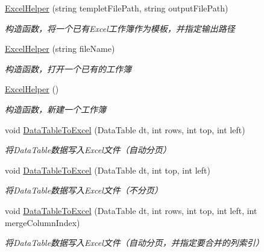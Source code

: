 \begin{DoxyCompactItemize}
\item 
\hyperlink{class_x_c_l_net_tools_1_1_office_1_1_excel_handler_1_1_excel_helper_a12c422938f2054941e10baa671676383}{Excel\-Helper} (string templet\-File\-Path, string output\-File\-Path)
\begin{DoxyCompactList}\small\item\em 构造函数，将一个已有\-Excel工作簿作为模板，并指定输出路径 \end{DoxyCompactList}\item 
\hyperlink{class_x_c_l_net_tools_1_1_office_1_1_excel_handler_1_1_excel_helper_a92dad5cbd48287b013aa81ca90d02fb6}{Excel\-Helper} (string file\-Name)
\begin{DoxyCompactList}\small\item\em 构造函数，打开一个已有的工作簿 \end{DoxyCompactList}\item 
\hyperlink{class_x_c_l_net_tools_1_1_office_1_1_excel_handler_1_1_excel_helper_ab7738aab96d5a2ebc7d5c8a72899edf1}{Excel\-Helper} ()
\begin{DoxyCompactList}\small\item\em 构造函数，新建一个工作簿 \end{DoxyCompactList}\item 
void \hyperlink{class_x_c_l_net_tools_1_1_office_1_1_excel_handler_1_1_excel_helper_aff2b9ad2316d2acf6908da2929b5a103}{Data\-Table\-To\-Excel} (Data\-Table dt, int rows, int top, int left)
\begin{DoxyCompactList}\small\item\em 将\-Data\-Table数据写入\-Excel文件（自动分页） \end{DoxyCompactList}\item 
void \hyperlink{class_x_c_l_net_tools_1_1_office_1_1_excel_handler_1_1_excel_helper_ad8dc84e458463633d1027acdfadc5d2c}{Data\-Table\-To\-Excel} (Data\-Table dt, int top, int left)
\begin{DoxyCompactList}\small\item\em 将\-Data\-Table数据写入\-Excel文件（不分页） \end{DoxyCompactList}\item 
void \hyperlink{class_x_c_l_net_tools_1_1_office_1_1_excel_handler_1_1_excel_helper_a0d9c977adcc92c1e57560f1d713f74be}{Data\-Table\-To\-Excel} (Data\-Table dt, int rows, int top, int left, int merge\-Column\-Index)
\begin{DoxyCompactList}\small\item\em 将\-Data\-Table数据写入\-Excel文件（自动分页，并指定要合并的列索引） \end{DoxyCompactList}\item 

\end{DoxyCompactItemize}
